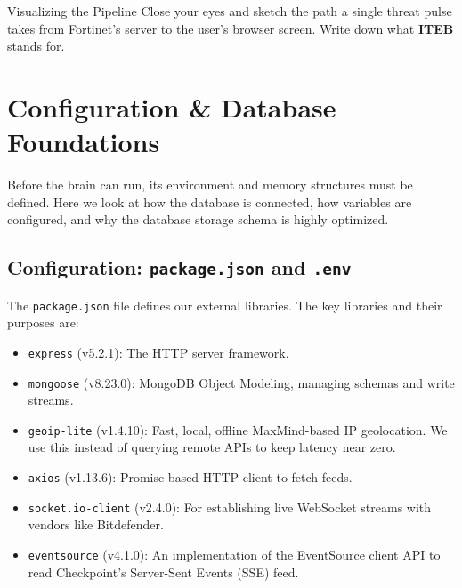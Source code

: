 \documentclass[11pt,a4paper]{report}
\begin{document}
\begin{activerecall}{Visualizing the Pipeline}
  Close your eyes and sketch the path a single threat pulse takes from Fortinet's server to the user's browser screen. Write down what \textbf{ITEB} stands for.
\end{activerecall}

\newpage

\chapter{Configuration \& Database Foundations}

Before the brain can run, its environment and memory structures must be defined. Here we look at how the database is connected, how variables are configured, and why the database storage schema is highly optimized.

\section{Configuration: \texttt{package.json} and \texttt{.env}}
The \texttt{package.json} file defines our external libraries. The key libraries and their purposes are:
\begin{itemize}
  \item \texttt{express} (v5.2.1): The HTTP server framework.
  \item \texttt{mongoose} (v8.23.0): MongoDB Object Modeling, managing schemas and write streams.
  \item \texttt{geoip-lite} (v1.4.10): Fast, local, offline MaxMind-based IP geolocation. We use this instead of querying remote APIs to keep latency near zero.
  \item \texttt{axios} (v1.13.6): Promise-based HTTP client to fetch feeds.
  \item \texttt{socket.io-client} (v2.4.0): For establishing live WebSocket streams with vendors like Bitdefender.
  \item \texttt{eventsource} (v4.1.0): An implementation of the EventSource client API to read Checkpoint's Server-Sent Events (SSE) feed.
\end{itemize}
\end{document}
